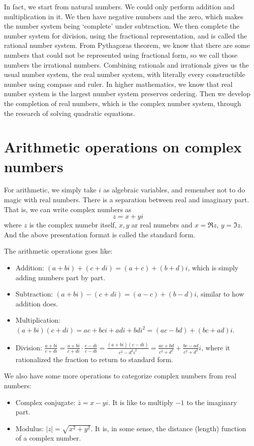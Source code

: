 \documentclass[12pt]{article}
\begin{document}
    In fact, we start from natural numbers. We could only perform addition and multiplication in it. We then have negative numbers and the zero, which makes the number system being `complete' under subtraction. We then complete the number system for division, using the fractional representation, and is called the rational number system. From Pythagoras theorem, we know that there are some numbers that could not be represented using fractional form, so we call those numbers the irrational numbers. Combining rationals and irrationals gives us the usual number system, the real number system, with literally every constructible number using compass and ruler. In higher mathematics, we know that real number system is the largest number system preserves ordering. Then we develop the completion of real numbers, which is the complex number system, through the research of solving quadratic equations.

    \section*{Arithmetic operations on complex numbers}
    For arithmetic, we simply take $i$ as algebraic variables, and remember not to do magic with real numbers. There is a separation between real and imaginary part. That is, we can write complex numbers as $$z=x+yi$$ where $z$ is the complex numebr itself, $x,y$ ar real numebrs and $x=\Re{z}$, $y=\Im{z}$. And the above presentation format is called the standard form.
    
    The arithmetic operations goes like:
    \begin{itemize}
        \item Addition: $(a+bi)+(c+di)=(a+c)+(b+d)i$, which is simply adding numbers part by part.
        \item Subtraction: $(a+bi)-(c+di)=(a-c)+(b-d)i$, similar to how addition does.
        \item Multiplication: $(a+bi)(c+di)=ac+bci+adi+bdi^2=(ac-bd)+(bc+ad)i$.
        \item Division: $\frac{a+bi}{c+di}=\frac{a+bi}{c+di}\cdot \frac{c-di}{c-di}=\frac{(a+bi)(c-di)}{c^2-d^2i^2}=\frac{ac+bd}{c^2+d^2}+\frac{bc-ad}{c^2+d^2}i$, where it rationalized the fraction to return to standard form.
    \end{itemize}
    
    We also have some more operations to categorize complex numbers from real numbers:
    \begin{itemize}
        \item Complex conjugate: $\overline{z}=x-yi$. It is like to multiply $-1$ to the imaginary part.
        \item Modulus: $|z|=\sqrt{x^2+y^2}$. It is, in some sense, the distance (length) function of a complex number.
    \end{itemize}
\end{document}
